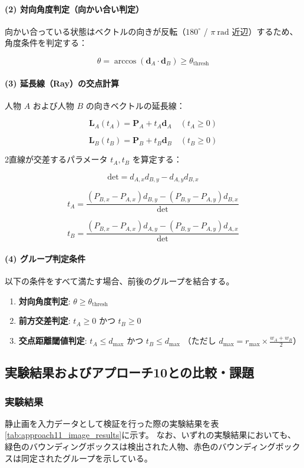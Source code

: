 \paragraph{(2) 対向角度判定（向かい合い判定）}
向かい合っている状態はベクトルの向きが反転（$180^\circ$ / $\pi\ \text{rad}$ 近辺）するため、角度条件を判定する：

$$\theta = \arccos(\mathbf{d}_A \cdot \mathbf{d}_B) \ge \theta_{\text{thresh}}$$

\paragraph{(3) 延長線（Ray）の交点計算}
人物 $A$ および人物 $B$ の向きベクトルの延長線：

$$\mathbf{L}_A(t_A) = \mathbf{P}_A + t_A \mathbf{d}_A \quad (t_A \ge 0)$$

$$\mathbf{L}_B(t_B) = \mathbf{P}_B + t_B \mathbf{d}_B \quad (t_B \ge 0)$$

2直線が交差するパラメータ $t_A, t_B$ を算定する：

$$\text{det} = d_{A,x} d_{B,y} - d_{A,y} d_{B,x}$$

$$t_A = \frac{(P_{B,x} - P_{A,x}) d_{B,y} - (P_{B,y} - P_{A,y}) d_{B,x}}{\text{det}}$$

$$t_B = \frac{(P_{B,x} - P_{A,x}) d_{A,y} - (P_{B,y} - P_{A,y}) d_{A,x}}{\text{det}}$$

\paragraph{(4) グループ判定条件}
以下の条件をすべて満たす場合、前後のグループを結合する。

\begin{enumerate}
    \item \textbf{対向角度判定}: $\theta \ge \theta_{\text{thresh}}$
    \item \textbf{前方交差判定}: $t_A \ge 0$ かつ $t_B \ge 0$
    \item \textbf{交点距離閾値判定}: $t_A \le d_{\text{max}}$ かつ $t_B \le d_{\text{max}}$
    （ただし $d_{\text{max}} = r_{\text{max}} \times \frac{w_A + w_B}{2}$）
\end{enumerate}

\subsection{実験結果およびアプローチ10との比較・課題}

\subsubsection{実験結果}
静止画を入力データとして検証を行った際の実験結果を表\ref{tab:approach11_image_results}に示す。
なお、いずれの実験結果においても、緑色のバウンディングボックスは検出された人物、赤色のバウンディングボックスは同定されたグループを示している。

